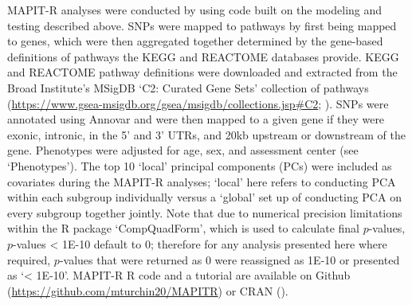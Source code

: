 MAPIT-R analyses were conducted by using code built on the modeling and testing described above. SNPs were mapped to pathways by first being mapped to genes, which were then aggregated together determined by the gene-based definitions of pathways the KEGG and REACTOME databases provide. KEGG and REACTOME pathway definitions were downloaded and extracted from the Broad Institute's MSigDB `C2: Curated Gene Sets' collection of pathways (\url{https://www.gsea-msigdb.org/gsea/msigdb/collections.jsp#C2}; \citep{Liberzon2011}). SNPs were annotated using Annovar \citep{Wang2010a} and were then mapped to a given gene if they were exonic, intronic, in the 5' and 3' UTRs, and 20kb upstream or downstream of the gene. Phenotypes were adjusted for age, sex, and assessment center (see `Phenotypes'). The top 10 `local' principal components (PCs) were included as covariates during the MAPIT-R analyses; `local' here refers to conducting PCA within each subgroup individually versus a `global' set up of conducting PCA on every subgroup together jointly. Note that due to numerical precision limitations within the R package `CompQuadForm', which is used to calculate final $p$-values, $p$-values < 1E-10 default to 0; therefore for any analysis presented here where required, $p$-values that were returned as 0 were reassigned as 1E-10 or presented as `< 1E-10'. MAPIT-R R code and a tutorial are available on Github (\url{https://github.com/mturchin20/MAPITR}) or CRAN (\url{}).







